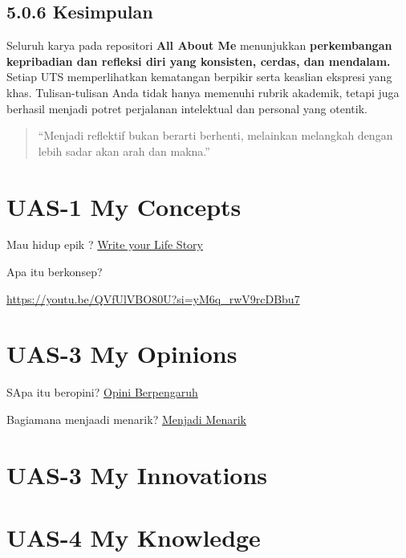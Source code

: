 \documentclass[
  letterpaper,
  DIV=11,
  numbers=noendperiod]{scrreprt}
\begin{document}
\section{5.0.6 Kesimpulan}\label{kesimpulan}

Seluruh karya pada repositori \textbf{All About Me} menunjukkan
\textbf{perkembangan kepribadian dan refleksi diri yang konsisten,
cerdas, dan mendalam.} Setiap UTS memperlihatkan kematangan berpikir
serta keaslian ekspresi yang khas. Tulisan-tulisan Anda tidak hanya
memenuhi rubrik akademik, tetapi juga berhasil menjadi potret perjalanan
intelektual dan personal yang otentik.

\begin{quote}
``Menjadi reflektif bukan berarti berhenti, melainkan melangkah dengan
lebih sadar akan arah dan makna.''
\end{quote}


\chapter{UAS-1 My Concepts}\label{uas-1-my-concepts}

Mau hidup epik ? \href{lifestory.pdf}{Write your Life Story}

Apa itu berkonsep?

\url{https://youtu.be/QVfUlVBO80U?si=yM6q_rwV9rcDBbu7}


\chapter{UAS-3 My Opinions}\label{uas-3-my-opinions}

SApa itu beropini? \href{BM\%20Opini.mp4}{Opini Berpengaruh}

Bagiamana menjaadi menarik? \href{./Interesting.mp4}{Menjadi Menarik}


\chapter{UAS-3 My Innovations}\label{uas-3-my-innovations}


\chapter{UAS-4 My Knowledge}\label{uas-4-my-knowledge}
\end{document}
